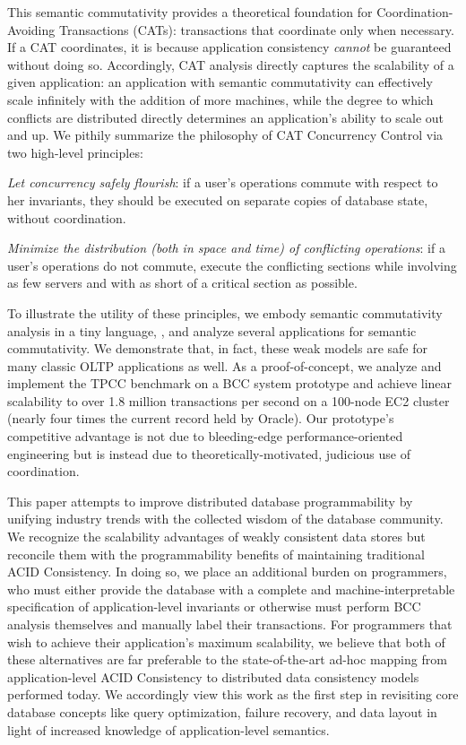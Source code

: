This semantic commutativity provides a theoretical foundation for
Coordination-Avoiding Transactions (CATs): transactions that
coordinate only when necessary.  If a CAT coordinates, it is because
application consistency \textit{cannot} be guaranteed without doing
so. Accordingly, CAT analysis directly captures the scalability of a
given application: an application with semantic commutativity can
effectively scale infinitely with the addition of more machines, while
the degree to which conflicts are distributed directly determines an
application's ability to scale out and up. We pithily summarize the
philosophy of CAT Concurrency Control via two high-level principles:
\begin{introenumerate}
\item \textit{Let concurrency safely flourish}: if a user's operations
  commute with respect to her invariants, they should be executed on
  separate copies of database state, without coordination.
\item \textit{Minimize the distribution (both in space and time) of
  conflicting operations}: if a user's operations do not commute,
  execute the conflicting sections while involving as few servers and
  with as short of a critical section as possible.
\end{introenumerate}
To illustrate the utility of these principles, we embody semantic
commutativity analysis in a tiny language, \lang, and analyze several
applications for semantic commutativity. We demonstrate that, in fact,
these weak models are safe for many classic OLTP applications as
well. As a proof-of-concept, we analyze and implement the TPCC
benchmark on a BCC system prototype and achieve linear scalability to
over 1.8 million transactions per second on a 100-node EC2 cluster
(nearly four times the current record held by Oracle). Our prototype's
competitive advantage is not due to bleeding-edge performance-oriented
engineering but is instead due to theoretically-motivated, judicious
use of coordination.

This paper attempts to improve distributed database programmability by
unifying industry trends with the collected wisdom of the database
community. We recognize the scalability advantages of weakly
consistent data stores but reconcile them with the programmability
benefits of maintaining traditional ACID Consistency. In doing so, we
place an additional burden on programmers, who must either provide the
database with a complete and machine-interpretable specification of
application-level invariants or otherwise must perform BCC analysis
themselves and manually label their transactions. For programmers that
wish to achieve their application's maximum scalability, we believe
that both of these alternatives are far preferable to the
state-of-the-art ad-hoc mapping from application-level ACID
Consistency to distributed data consistency models performed today. We
accordingly view this work as the first step in revisiting core
database concepts like query optimization, failure recovery, and data
layout in light of increased knowledge of application-level semantics.
